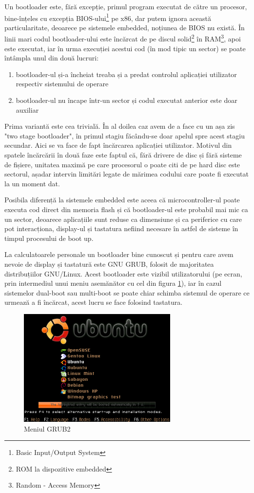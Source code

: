 \documentclass[12pt,a4paper,titlepage]{report}
\begin{document}
Un bootloader este, fără excepție, primul program executat de către un procesor, bine-înțeles cu excepția BIOS-ului\footnote{Basic Input/Output System} pe x86, dar putem ignora această particularitate, deoarece pe sistemele embedded, noțiunea de BIOS nu există.
În linii mari codul bootloader-ului este încărcat de pe discul solid\footnote{ROM la dispozitive embedded} în RAM\footnote{Random - Access Memory}, apoi este executat, iar în urma execuției acestui cod (în mod tipic un sector) se poate întâmpla unul din două lucruri:
\begin{enumerate}
\item bootloader-ul și-a încheiat treaba și a predat controlul aplicației utilizator respectiv sistemului de operare
\item bootloader-ul nu încape într-un sector și codul executat anterior este doar auxiliar
\end{enumerate}
Prima variantă este cea trivială. În al doilea caz avem de a face cu un așa zis "two stage bootloader", în primul stagiu făcându-se doar apelul spre acest stagiu secundar. Aici se va face de fapt încărcarea aplicației utilizator. Motivul din spatele încărcării în două faze este faptul că, fără drivere de disc și fără sisteme de fișiere, unitatea maximă pe care procesorul o poate citi de pe hard disc este sectorul, așadar intervin limitări legate de mărimea codului care poate fi executat la un moment dat.

Posibila diferență la sistemele embedded este aceea că microcontroller-ul poate executa cod direct din memoria flash și că bootloader-ul este probabil mai mic ca un sector, deoarece aplicațiile sunt reduse ca dimensiune și ca periferice cu care pot interacționa, display-ul și tastatura nefiind necesare în astfel de sisteme în timpul procesului de boot up.

La calculatoarele personale un bootloader bine cunoscut și pentru care avem nevoie de display și tastatură este GNU GRUB, folosit de majoritatea distribuțiilor GNU/Linux. Acest bootloader este vizibil utilizatorului (pe ecran, prin intermediul unui meniu asemănător cu cel din figura \ref{grub2menu}), iar în cazul sistemelor dual-boot sau multi-boot se poate chiar schimba sistemul de operare ce urmează a fi încărcat, acest lucru se face folosind tastatura.
\begin{figure}[h]
    \centering
    \includegraphics{grub}
    \caption{Meniul GRUB2}
    \label{grub2menu}
\end{figure}
\end{document}
